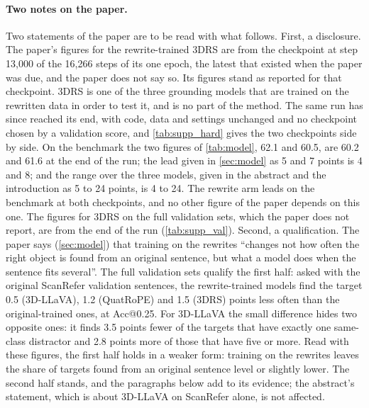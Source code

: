 \paragraph{Two notes on the paper.}
Two statements of the paper are to be read with what follows.
First, a disclosure.
The paper's figures for the rewrite-trained 3DRS are from the checkpoint at step 13,000 of the 16,266 steps of its one epoch, the latest that existed when the paper was due, and the paper does not say so.
Its figures stand as reported for that checkpoint.
3DRS is one of the three grounding models that are trained on the rewritten data in order to test it, and is no part of the method.
The same run has since reached its end, with code, data and settings unchanged and no checkpoint chosen by a validation score, and \cref{tab:supp_hard} gives the two checkpoints side by side.
On the benchmark the two figures of \cref{tab:model}, 62.1 and 60.5, are 60.2 and 61.6 at the end of the run; the lead given in \cref{sec:model} as 5 and 7 points is 4 and 8; and the range over the three models, given in the abstract and the introduction as 5 to 24 points, is 4 to 24.
The rewrite arm leads on the benchmark at both checkpoints, and no other figure of the paper depends on this one.
The figures for 3DRS on the full validation sets, which the paper does not report, are from the end of the run (\cref{tab:supp_val}).
Second, a qualification.
The paper says (\cref{sec:model}) that training on the rewrites ``changes not how often the right object is found from an original sentence, but what a model does when the sentence fits several''.
The full validation sets qualify the first half: asked with the original ScanRefer validation sentences, the rewrite-trained models find the target 0.5 (3D-LLaVA), 1.2 (QuatRoPE) and 1.5 (3DRS) points less often than the original-trained ones, at Acc@0.25.
For 3D-LLaVA the small difference hides two opposite ones: it finds 3.5 points fewer of the targets that have exactly one same-class distractor and 2.8 points more of those that have five or more.
Read with these figures, the first half holds in a weaker form: training on the rewrites leaves the share of targets found from an original sentence level or slightly lower.
The second half stands, and the paragraphs below add to its evidence; the abstract's statement, which is about 3D-LLaVA on ScanRefer alone, is not affected.

